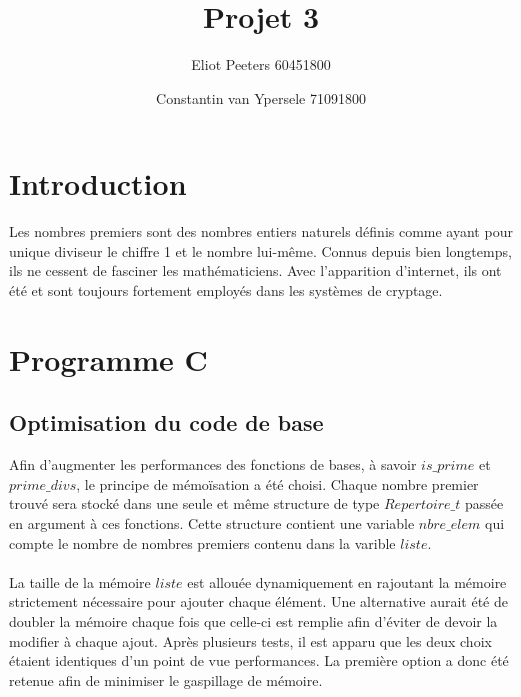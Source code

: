 \documentclass{article}
\title{Projet 3}
\author{Eliot Peeters 60451800}
\author{Constantin van Ypersele 71091800}
\begin{document}
\maketitle

\section{Introduction}
Les nombres premiers sont des nombres entiers naturels définis comme ayant pour unique diviseur le chiffre 1 et le nombre lui-même. Connus depuis bien longtemps, ils ne cessent de fasciner les mathématiciens. Avec l'apparition d'internet, ils ont été et sont toujours fortement employés dans les systèmes de cryptage.

\section{Programme C}

\subsection{Optimisation du code de base}
Afin d'augmenter les performances des fonctions de bases, à savoir $is\_prime$ et $prime\_divs$, le principe de mémoïsation a été choisi. Chaque nombre premier trouvé sera stocké dans une seule et même structure de type $Repertoire\_t$ passée en argument à ces fonctions. Cette structure contient une variable $nbre\_elem$ qui compte le nombre de nombres premiers contenu dans la varible $liste$. \\ \\
\danger La taille de la mémoire $liste$ est allouée dynamiquement en rajoutant la mémoire strictement nécessaire pour ajouter chaque élément. Une alternative aurait été de doubler la mémoire chaque fois que celle-ci est remplie afin d'éviter de devoir la modifier à chaque ajout. Après plusieurs tests, il est apparu que les deux choix étaient identiques d'un point de vue performances. La première option a donc été retenue afin de minimiser le gaspillage de mémoire. 
\end{document}
